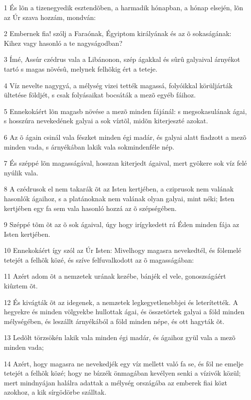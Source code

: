 \par 1 És lõn a tizenegyedik esztendõben, a harmadik hónapban, a hónap elsején, lõn az Úr szava hozzám, mondván:
\par 2 Embernek fia! szólj a Faraónak, Égyiptom királyának és az õ sokaságának: Kihez vagy hasonló a te nagyságodban?
\par 3 Ímé, Assúr czédrus vala a Libánonon,  szép ágakkal és sûrû galyaival árnyékot tartó s magas növésû, melynek felhõkig ért a teteje.
\par 4 Víz nevelte nagygyá, a mélység vizei tették magassá, folyóikkal körüljárták ültetése földjét, s csak folyásaikat bocsáták a mezõ egyéb fáihoz.
\par 5 Ennekokáért lõn magasb növése a mezõ minden fájánál: s megsokasulának ágai, s hosszúra nevekedének galyai a sok víztõl, midõn kiterjeszté azokat.
\par 6 Az õ ágain csinál vala fészket minden égi madár, és galyai alatt fiadzott a mezõ minden vada, s árnyékában lakik vala sokmindenféle nép.
\par 7 És széppé lõn magasságával, hosszan kiterjedt ágaival, mert gyökere sok víz felé nyúlik vala.
\par 8 A czédrusok el nem takarák õt az Isten kertjében, a cziprusok nem valának hasonlók ágaihoz, s a platánoknak nem valának olyan galyai, mint néki; Isten kertjében egy fa sem vala hasonló hozzá az õ szépségében.
\par 9 Széppé tõm õt az õ sok ágaival, úgy hogy irígykedett rá Éden minden fája az Isten kertjében.
\par 10 Ennekokáért így szól az Úr Isten: Mivelhogy magasra nevekedtél, és fölemelé tetejét a felhõk közé, és szíve felfuvalkodott az õ magasságában:
\par 11 Azért adom õt a nemzetek urának kezébe, bánjék el vele, gonoszságáért kiûztem õt.
\par 12 És kivágták õt az idegenek, a nemzetek legkegyetlenebbjei és leterítették. A hegyekre és minden völgyekbe hullottak ágai, és összetörtek galyai a föld minden mélységében, és leszállt árnyékából a föld minden népe, és ott hagyták õt.
\par 13 Ledõlt törzsökén lakik vala minden égi madár, és ágaihoz gyül vala a mezõ minden vada;
\par 14 Azért, hogy magasra ne nevekedjék egy víz mellett való fa se, és föl ne emelje tetejét a felhõk közé; hogy ne bízzék önmagában kevélyen senki a vízivók közül; mert mindnyájan halálra adattak a mélység országába az emberek fiai közt azokhoz, a kik sírgödörbe szálltak.
